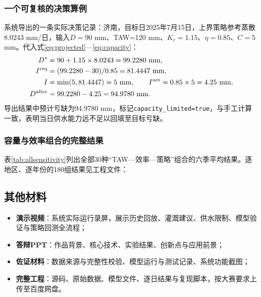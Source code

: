 \subsubsection{一个可复核的决策算例}
系统导出的一条实际决策记录：济南，目标日2025年7月15日，上界策略参考蒸散8.0243 mm/日，输入$D=90$ mm、TAW=120 mm、$K_c=1.15$、$\eta=0.85$、$C=5$ mm。代入式\eqref{eq:projected}—\eqref{eq:capacity}：
\begin{align}
D^*&=90+1.15\times8.0243=99.2280\ \mathrm{mm},\\
I^{\rm req}&=(99.2280-30)/0.85=81.4447\ \mathrm{mm},\\
I&=\min(5,81.4447)=5\ \mathrm{mm},\qquad I^{\rm net}=0.85\times5=4.25\ \mathrm{mm},\\
D^{\rm after}&=99.2280-4.25=94.9780\ \mathrm{mm}.
\end{align}
导出结果中预计亏缺为94.9780 mm，标记\texttt{capacity\_limited=true}，与手工计算一致，表明当日供水能力远不足以回填至目标亏缺。

\subsubsection{容量与效率组合的完整结果}
表\ref{tab:allsensitivity}列出全部30种“TAW—效率—策略”组合的六季平均结果。逐地区、逐年份的180组结果见工程文件：




\subsection{其他材料}
\begin{itemize}
\item \textbf{演示视频}：系统实际运行录屏，展示历史回放、灌溉建议、供水限制、模型验证与策略回测全流程；
\item \textbf{答辩PPT}：作品背景、核心技术、实验结果、创新点与应用前景；
\item \textbf{佐证材料}：数据来源与完整性校验、模型运行与测试记录、系统功能截图；
\item \textbf{完整工程}：源码、原始数据、模型文件、逐日结果与复现脚本，按大赛要求上传至百度网盘。
\end{itemize}
